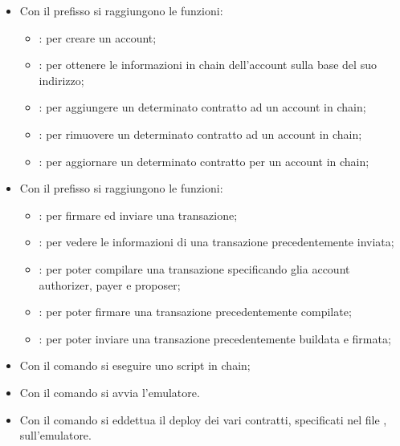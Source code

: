 \begin{itemize}
	\item Con il prefisso  si raggiungono le funzioni:
	\begin{itemize}
		\item {}: per creare un account;
		\item {}: per ottenere le informazioni in chain dell'account sulla base del suo indirizzo;
		\item {}: per aggiungere un determinato contratto ad un account in chain;
		\item {}: per rimuovere un determinato contratto ad un account in chain;
		\item {}: per aggiornare un determinato contratto per un account in chain;
	\end{itemize}
	\item Con il prefisso  si raggiungono le funzioni:
	\begin{itemize}
		\item {}: per firmare ed inviare una transazione; 
		\item {}: per vedere le informazioni di una transazione precedentemente inviata;
		\item {}: per poter compilare una transazione specificando glia account authorizer, payer e proposer;
		\item {}: per poter firmare una transazione precedentemente compilate;
		\item {}: per poter inviare una transazione precedentemente buildata e firmata;
	\end{itemize}
	\item Con il comando  si eseguire uno script in chain;
	\item Con il comando  si avvia l'emulatore.
	\item Con il comando  si eddettua il deploy dei vari contratti, specificati nel file , sull'emulatore.
\end{itemize}